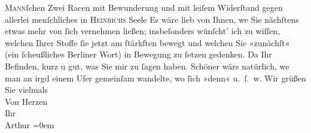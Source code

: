 \begin{ledgroupsized}[t]{13cm}
                  \textsc{Mann}ſchen Zwei Racen mit
               Bewunderung und mit  leiſem Widerſtand gegen
               allerlei menſchliches in \textsc{Heinrichs} Seele\pend
           \pstart
           {\pb}Es wäre lieb von Ihnen, we{\geminationn} Sie nächſtens etwas mehr von ſich vernehmen ließen;
               insbeſonders wünſcht’ ich zu wiſſen, welchen Ihrer Stoffe ſie jetzt am ſtärkſten
               bewegt und welchen Sie »zunächſt« (ein ſcheußliches Berliner Wort) in Bewegung zu ſetzen gedenken. Da{\geminationn} Ihr Befinden, kurz u gut, was Sie mir \introOben{}zu\introOben{} ſagen haben\textcolor{gray}{.} Schöner wärs natürlich,
                  we{\geminationn}{ }{\pb}man an irgd einem Ufer gemeinſam wandelte,
               wo ſich »denn« u. ſ. w.\pend
           \pstart
           Wir grüßen Sie vielmals
               {\\[\baselineskip]}Von Herzen {\\[\baselineskip]}Ihr {\\[\baselineskip]}\spacefill\mbox{Arthur}\pend
           \leftskip=0em{}
         
         \endnumbering{}\end{ledgroupsized}  \newcommand{\dateiname}{L03009}\newcommand{\titel}{Arthur Schnitzler an Felix Salten, 5. 8. 1907}\newcommand{\editorInnen}{Martin Anton Müller und Laura Untner}
      